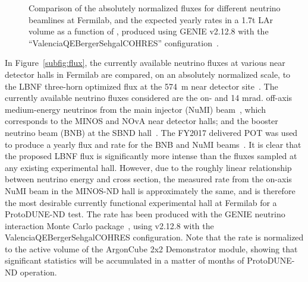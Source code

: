 \begin{figure}[htb]
  \centering
  \caption{Comparison of the absolutely normalized fluxes for different neutrino beamlines at Fermilab, and the expected yearly rates in a 1.7t LAr volume as a function of \enu, produced using GENIE v2.12.8 with the ``ValenciaQEBergerSehgalCOHRES'' configuration~\cite{genie}.}
  \label{fig:beam_options}
\end{figure}
In Figure~\ref{subfig:flux}, the currently available neutrino fluxes at various near detector halls in Fermilab are compared, on an absolutely normalized scale, to the LBNF three-horn optimized flux at the 574~m near detector site~\addcite. The currently available neutrino fluxes considered are the on- and 14 mrad. off-axis medium-energy neutrinos from the main injector (NuMI) beam~\cite{numi}, which corresponds to the MINOS and NOvA near detector halls; and the booster neutrino beam (BNB) at the SBND hall~\addcite. The FY2017 delivered POT was used to produce a yearly flux and rate for the BNB and NuMI beams~\cite{fnal_beam_2017}. It is clear that the proposed LBNF flux is significantly more intense than the fluxes sampled at any existing experimental hall. However, due to the roughly linear relationship between neutrino energy and cross section, the measured rate from the on-axis NuMI beam in the MINOS-ND hall is approximately the same, and is therefore the most desirable currently functional experimental hall at Fermilab for a ProtoDUNE-ND test. The rate has been produced with the GENIE neutrino interaction Monte Carlo package~\cite{genie}, using v2.12.8 with the ValenciaQEBergerSehgalCOHRES configuration. Note that the rate is normalized to the active volume of the ArgonCube 2x2 Demonstrator module, showing that significant statistics will be accumulated in a matter of months of ProtoDUNE-ND operation.

